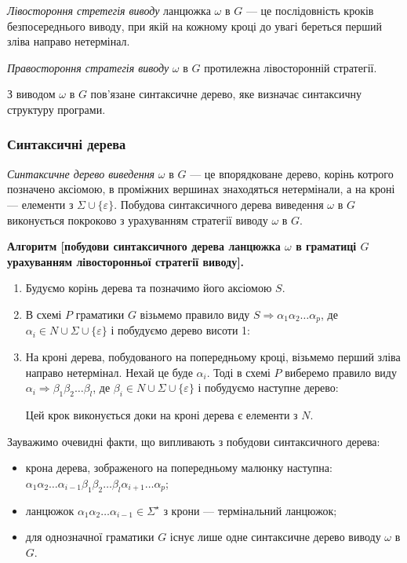 \textit{Лівостороння стретегія виводу} ланцюжка $\omega$ в $G$ --- це послідовність кроків безпосереднього виводу, при якій на кожному кроці до увагі береться перший зліва направо нетермінал. \medskip

\textit{Правостороння стратегія виводу} $\omega$ в $G$ протилежна лівосторонній стратегії. \medskip

З виводом $\omega$ в $G$ пов'язане синтаксичне дерево, яке визначає синтаксичну структуру програми.

\subsubsection{Синтаксичні дерева}

\textit{Синтаксичне дерево виведення} $\omega$ в $G$ --- це впорядковане дерево, корінь котрого позначено аксіомою, в проміжних вершинах знаходяться нетермінали, а на кроні --- елементи з $\Sigma \cup \{\varepsilon\}$. Побудова синтаксичного дерева виведення $\omega$ в $G$ виконується покроково з урахуванням стратегії виводу $\omega$ в $G$. \medskip


\textbf{Алгоритм [побудови синтаксичного дерева ланцюжка $\omega$ в граматиці $G$ урахуванням лівосторонньої стратегії виводу].}
\begin{enumerate}
	\item Будуємо корінь дерева та позначимо його аксіомою $S$.

	\item В схемі $P$ граматики $G$ візьмемо правило виду $S \Rightarrow \alpha_1 \alpha_2 \ldots \alpha_p$, де $\alpha_i \in N \cup \Sigma \cup \{\varepsilon\} $	і побудуємо дерево висоти 1: 
	\begin{figure}[H]
		\centering
		
	\end{figure}

	\item На кроні дерева, побудованого на попередньому кроці, візьмемо перший зліва направо нетермінал. Нехай це буде $\alpha_i$. Тоді в схемі $P$ виберемо правило виду $\alpha_i \Rightarrow \beta_1 \beta_2 \ldots \beta_l$, де $\beta_i \in N \cup \Sigma \cup \{\varepsilon\}$ і побудуємо наступне дерево: 
	\begin{figure}[H]
		\centering
		
	\end{figure}

	Цей крок виконується доки на кроні дерева є елементи з $N$.
\end{enumerate}

Зауважимо очевидні факти, що випливають з побудови синтаксичного дерева:
\begin{itemize}
	\item крона дерева, зображеного на попередньому малюнку наступна: $\alpha_1 \alpha_2 \ldots \alpha_{i - 1} \beta_1 \beta_2 \ldots \beta_l \alpha_{i + 1} \ldots \alpha_p$;
	\item ланцюжок $\alpha_1 \alpha_2 \ldots \alpha_{i - 1} \in \Sigma^\star$ з крони --- термінальний ланцюжок;
	\item для однозначної граматики $G$ існує лише одне синтаксичне дерево виводу $\omega$ в $G$.
\end{itemize}

